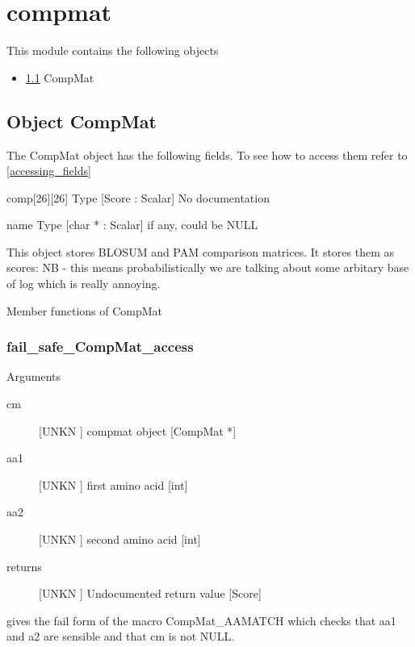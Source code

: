 \section{compmat}
\label{module_compmat}
This module contains the following objects

\begin{itemize}
\item \ref{object_CompMat} CompMat

\end{itemize}
\subsection{Object CompMat}

\label{object_CompMat}

The CompMat object has the following fields. To see how to access them refer to \ref{accessing_fields}
\begin{description}
\item{comp[26][26]} Type [Score : Scalar] No documentation

\item{name} Type [char * : Scalar]  if any, could be NULL

\end{description}
This object stores BLOSUM and PAM 
comparison matrices. It stores them as
scores: NB - this means probabilistically
we are talking about some arbitary base of
log which is really annoying.




Member functions of CompMat

\subsubsection{fail_safe_CompMat_access}

Arguments
\begin{description}
\item[cm] [UNKN ] compmat object [CompMat *]
\item[aa1] [UNKN ] first amino acid [int]
\item[aa2] [UNKN ] second amino acid [int]
\item[returns] [UNKN ] Undocumented return value [Score]
\end{description}
gives the fail form of the macro CompMat_AAMATCH which 
checks that aa1 and a2 are sensible and that cm is not NULL.


